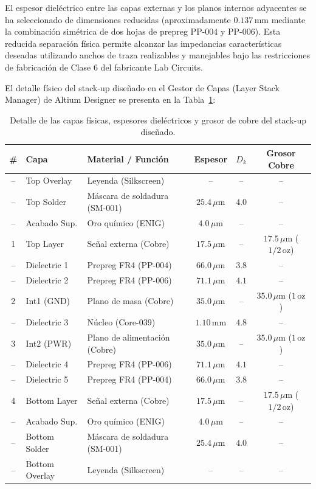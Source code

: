 \documentclass[12pt,a4paper]{article}
\begin{document}
El espesor dieléctrico entre las capas externas y los planos internos adyacentes se ha seleccionado de dimensiones reducidas (aproximadamente $0.137\,\text{mm}$ mediante la combinación simétrica de dos hojas de prepreg PP-004 y PP-006). Esta reducida separación física permite alcanzar las impedancias características deseadas utilizando anchos de traza realizables y manejables bajo las restricciones de fabricación de Clase 6 del fabricante Lab Circuits.

El detalle físico del stack-up diseñado en el Gestor de Capas (Layer Stack Manager) de Altium Designer se presenta en la Tabla~\ref{tab:stackup_capas}:

\begin{table}[htbp]
\centering
\small
\begin{tabularx}{\textwidth}{|c|l|X|c|c|c|}
\hline
\textbf{\#} & \textbf{Capa} & \textbf{Material / Función} & \textbf{Espesor} & \textbf{$D_k$} & \textbf{Grosor Cobre} \\ \hline
-- & Top Overlay & Leyenda (Silkscreen) & -- & -- & -- \\ \hline
-- & Top Solder & Máscara de soldadura (SM-001) & $25.4\,\mu\text{m}$ & $4.0$ & -- \\ \hline
-- & Acabado Sup. & Oro químico (ENIG) & $4.0\,\mu\text{m}$ & -- & -- \\ \hline
1 & Top Layer & Señal externa (Cobre) & $17.5\,\mu\text{m}$ & -- & $17.5\,\mu\text{m}$ ($1/2\,\text{oz}$) \\ \hline
-- & Dielectric 1 & Prepreg FR4 (PP-004) & $66.0\,\mu\text{m}$ & $3.8$ & -- \\ \hline
-- & Dielectric 2 & Prepreg FR4 (PP-006) & $71.1\,\mu\text{m}$ & $4.1$ & -- \\ \hline
2 & Int1 (GND) & Plano de masa (Cobre) & $35.0\,\mu\text{m}$ & -- & $35.0\,\mu\text{m}$ ($1\,\text{oz}$) \\ \hline
-- & Dielectric 3 & Núcleo (Core-039) & $1.10\,\text{mm}$ & $4.8$ & -- \\ \hline
3 & Int2 (PWR) & Plano de alimentación (Cobre) & $35.0\,\mu\text{m}$ & -- & $35.0\,\mu\text{m}$ ($1\,\text{oz}$) \\ \hline
-- & Dielectric 4 & Prepreg FR4 (PP-006) & $71.1\,\mu\text{m}$ & $4.1$ & -- \\ \hline
-- & Dielectric 5 & Prepreg FR4 (PP-004) & $66.0\,\mu\text{m}$ & $3.8$ & -- \\ \hline
4 & Bottom Layer & Señal externa (Cobre) & $17.5\,\mu\text{m}$ & -- & $17.5\,\mu\text{m}$ ($1/2\,\text{oz}$) \\ \hline
-- & Acabado Sup. & Oro químico (ENIG) & $4.0\,\mu\text{m}$ & -- & -- \\ \hline
-- & Bottom Solder & Máscara de soldadura (SM-001) & $25.4\,\mu\text{m}$ & $4.0$ & -- \\ \hline
-- & Bottom Overlay & Leyenda (Silkscreen) & -- & -- & -- \\ \hline
\end{tabularx}
\caption{Detalle de las capas físicas, espesores dieléctricos y grosor de cobre del stack-up diseñado.}
\label{tab:stackup_capas}
\end{table}
\end{document}
